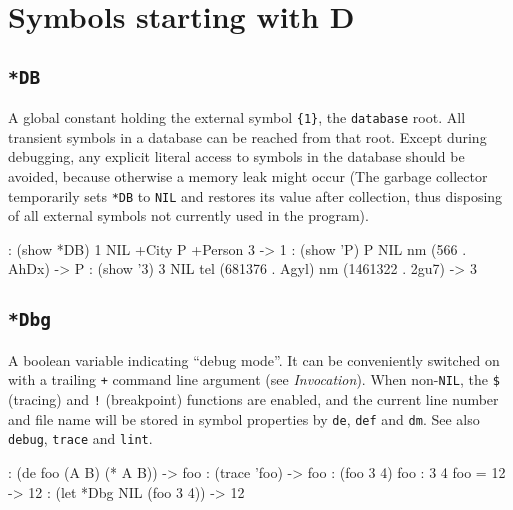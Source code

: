 %
%
%



\chapter{Symbols starting with D}
\label{sec:func-ref-D-}

 
\section*{\texttt{*DB}}
\label{sec:func-ref-D-*DB}


A global constant holding the external symbol \texttt{\{1\}}, the \texttt{database}
root. All transient symbols in a database can be reached from that root.
Except during debugging, any explicit literal access to symbols in the
database should be avoided, because otherwise a memory leak might occur
(The garbage collector temporarily sets \texttt{*DB} to \texttt{NIL} and restores its
value after collection, thus disposing of all external symbols not
currently used in the program).


\begin{wideverbatim}
: (show *DB)
{1} NIL
   +City {P}
   +Person {3}
-> {1}
: (show '{P})
{P} NIL
   nm (566 . {AhDx})
-> {P}
: (show '{3})
{3} NIL
   tel (681376 . {Agyl})
   nm (1461322 . {2gu7})
-> {3}
\end{wideverbatim}

 
\section*{\texttt{*Dbg}}
\label{sec:func-ref-D-*Dbg}


A boolean variable indicating ``debug mode''. It can be conveniently
switched on with a trailing \texttt{+} command line argument (see
\emph{Invocation}). When non-\texttt{NIL}, the \texttt{\$} (tracing) and
\texttt{!} (breakpoint) functions are enabled, and the current line number and
file name will be stored in symbol properties by \texttt{de}, \texttt{def} and \texttt{dm}.
See also \texttt{debug}, \texttt{trace} and \texttt{lint}.


\begin{wideverbatim}
: (de foo (A B) (* A B))
-> foo
: (trace 'foo)
-> foo
: (foo 3 4)
 foo : 3 4
 foo = 12
-> 12
: (let *Dbg NIL (foo 3 4))
-> 12
\end{wideverbatim}

